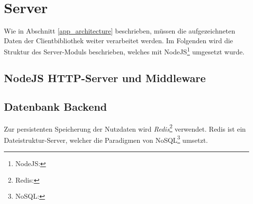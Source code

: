 \section{Server}
\label{server}
Wie in Abschnitt \ref{app_architecture} beschrieben, müssen die aufgezeichneten Daten der Clientbibliothek weiter verarbeitet werden. Im Folgenden wird die Struktur des Server-Moduls beschrieben, welches mit NodeJS\footnote{NodeJS: } umgesetzt wurde.
\subsection{NodeJS HTTP-Server und Middleware}

\subsection{Datenbank Backend}

Zur persistenten Speicherung der Nutzdaten wird \textit{Redis}\footnote{Redis: } verwendet. Redis ist ein Dateistruktur-Server, welcher die Paradigmen von NoSQL\footnote{NoSQL:} umsetzt.



